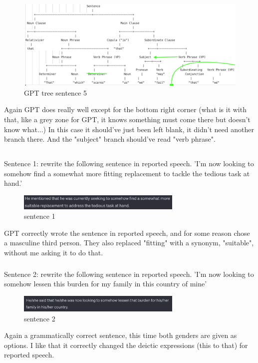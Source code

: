 \documentclass{article}
\begin{document}
\begin{figure}[H]
  \centering
  \includegraphics[width=1\textwidth]{b5.png} 
  \caption{GPT tree sentence 5}
\end{figure}
Again GPT does really well except for the bottom right corner (what is it with that, like a grey zone for GPT, it knows something must come there but doesn't know what...) In this case it should've just been left blank, it didn't need another branch there. And the "subject" branch should've read "verb phrase". 

\subsection{}	%

\subsubsection{}	%
Sentence 1: rewrite the following sentence in reported speech. 'I'm now looking to somehow find a somewhat more fitting replacement to tackle the tedious task at hand.' \\
\begin{figure}[H]
  \centering
  \includegraphics[width=0.7\textwidth]{2sen1.png} 
  \caption{sentence 1}
\end{figure}
GPT correctly wrote the sentence in reported speech, and for some reason chose a masculine third person. They also replaced "fitting" with a synonym, "suitable", without me asking it to do that. 

\subsubsection{}	%
Sentence 2: rewrite the following sentence in reported speech. 'I'm now looking to somehow lessen this burden for my family in this country of mine' \\
\begin{figure}[H]
  \centering
  \includegraphics[width=0.7\textwidth]{2sen2.png} 
  \caption{sentence 2}
\end{figure}
Again a grammatically correct sentence, this time both genders are given as options. I like that it correctly changed the deictic expressions (this to that) for reported speech. 
\end{document}

